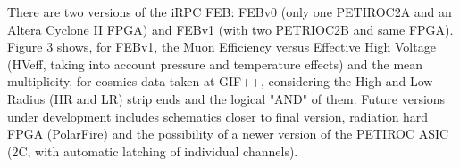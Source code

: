 \vskip-2cm

There are two versions of the iRPC FEB: FEBv0 (only one PETIROC2A and an Altera Cyclone II FPGA) and FEBv1 (with two PETRIOC2B and same FPGA). Figure 3 shows, for FEBv1, the Muon Efficiency versus Effective High  Voltage (HVeff, taking into account pressure and temperature effects) and the mean multiplicity, for cosmics data taken at GIF++, considering the High and Low Radius (HR and LR) strip ends and the logical "AND" of them. Future versions under development includes schematics closer to final version, radiation hard FPGA (PolarFire) and the possibility of a newer version of the PETIROC ASIC (2C, with automatic latching of individual channels).  










